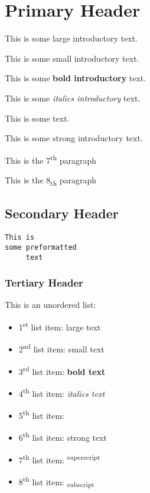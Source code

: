 \documentclass[12pt]{article}
\begin{document}


\section{Primary Header}
This is some \Large{large introductory} text.

This is some \scriptsize{small introductory} text.

This is some \textbf{bold introductory} text.

This is some \textit{italics introductory} text.

This is some  text.

This is some \textmd{strong introductory} text.

This is the 7\textsuperscript{th} paragraph

This is the 8\textsubscript{th} paragraph


\subsection{Secondary Header}
\begin{verbatim}This is
some preformatted
     text\end{verbatim}


\subsubsection{Tertiary Header}

This is an unordered list:


\begin{itemize}

    \item 1\textsuperscript{st} list item: \Large{large text}

    \item 2\textsuperscript{nd} list item: \scriptsize{small text}

    \item 3\textsuperscript{rd} list item: \textbf{bold text}

    \item 4\textsuperscript{th} list item: \textit{italics text}

    \item 5\textsuperscript{th} list item: 

    \item 6\textsuperscript{th} list item: \textmd{strong text}

    \item 7\textsuperscript{th} list item: \textsuperscript{superscript}

    \item 8\textsuperscript{th} list item: \textsubscript{subscript}

\end{itemize}
\end{document}
